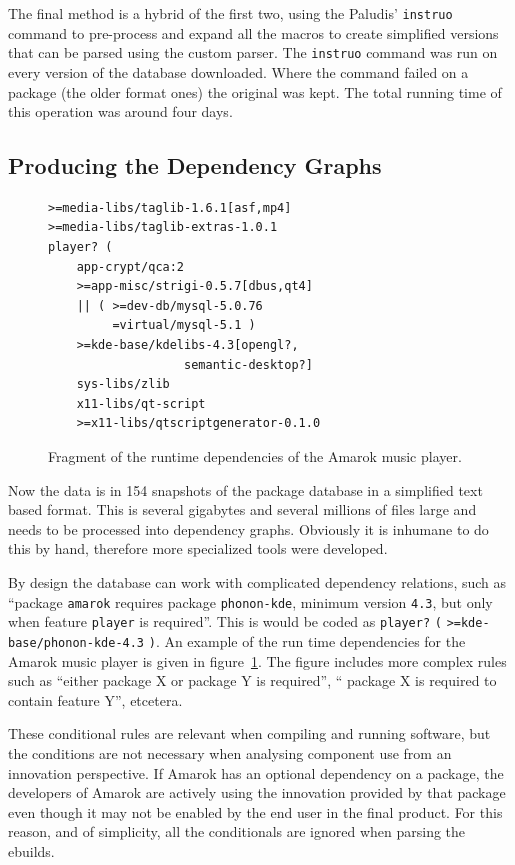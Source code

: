 \documentclass[smallextended,final]{svjour3}
\begin{document}
The final method is a hybrid of the first two, using the Paludis' \verb|instruo| command to pre-process and expand all the macros to create simplified versions that can be parsed using the custom parser. The \verb|instruo| command was run on every version of the database downloaded. Where the command failed on a package (the older format ones) the original was kept. The total running time of this operation was around four days.

\subsection{Producing the Dependency Graphs}

\begin{figure}
\small\centering
\begin{BVerbatim}
>=media-libs/taglib-1.6.1[asf,mp4]
>=media-libs/taglib-extras-1.0.1
player? (
    app-crypt/qca:2
    >=app-misc/strigi-0.5.7[dbus,qt4]
    || ( >=dev-db/mysql-5.0.76
         =virtual/mysql-5.1 )
    >=kde-base/kdelibs-4.3[opengl?,
                   semantic-desktop?]
    sys-libs/zlib
    x11-libs/qt-script
    >=x11-libs/qtscriptgenerator-0.1.0
\end{BVerbatim}
\caption{Fragment of the runtime dependencies of the Amarok music player.}\label{fig:amarokruntime}
\end{figure}

Now the data is in 154 snapshots of the package database in a simplified text based format. This is several gigabytes and several millions of files large and needs to be processed into dependency graphs. Obviously it is inhumane to do this by hand, therefore more specialized tools were developed.

By design the database can work with complicated dependency relations, such as ``package \verb|amarok| requires package \verb|phonon-kde|, minimum version \verb|4.3|, but only when feature \verb|player| is required''. This is would be coded as \verb|player?| \verb|(| \verb|>=kde-base/phonon-kde-4.3| \verb|)|. An example of the run time dependencies for the Amarok music player is given in figure~\ref{fig:amarokruntime}. The figure includes more complex rules such as ``either package X or package Y is required'', `` package X is required to contain feature Y'', etcetera.

These conditional rules are relevant when compiling and running software, but the conditions are not necessary when analysing component use from an innovation perspective. If Amarok has an optional dependency on a package, the developers of Amarok are actively using the innovation provided by that package even though it may not be enabled by the end user in the final product. For this reason, and of simplicity, all the conditionals are ignored when parsing the ebuilds.
\end{document}
